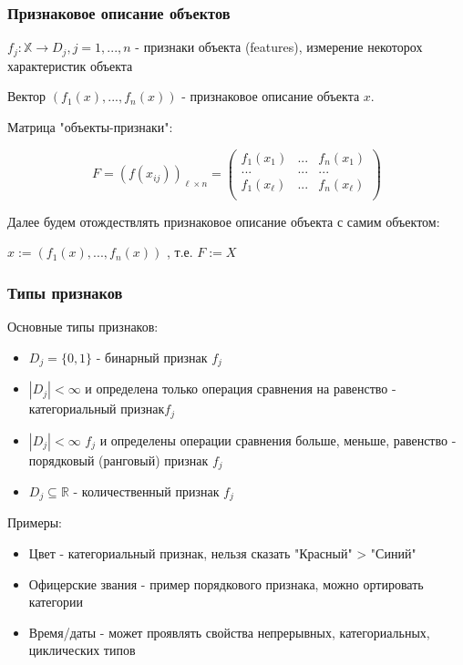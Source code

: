 \documentclass{beamer}
\begin{document}
	\begin{frame}
		\frametitle{Признаковое описание объектов}
		
		$f_j: \mathbb{X} \to D_j, j=1, ..., n$ - признаки объекта (features), измерение некоторох характеристик объекта
		
		
	
		Вектор $(f_1(x), ..., f_n(x))$ - признаковое описание объекта $x$.
		
		Матрица "объекты-признаки":
		
		 $$
		 F = (f(x_{ij}))_{\ell \times n} = 
		 \begin{pmatrix}
		 	f_{1}(x_1) & ... & f_{n}(x_1) \\
		 	... & ... & ... \\
		 	f_{1}(x_{\ell}) & ... & f_{n}(x_{\ell}) \\		 	
		 \end{pmatrix}
		 $$
		 
		 Далее будем отождествлять признаковое описание объекта с самим объектом:
		 
		 $x := (f_1(x), ..., f_n(x))$
		 , т.е. $F := X$
	\end{frame}
		
	
	\begin{frame}
		\frametitle{Типы признаков}
		Основные типы признаков:
		\begin{itemize}
			\item $D_j = \{0, 1\}$ - бинарный признак $f_j$
			\item $|D_j| < \infty$ и определена только операция сравнения на равенство - категориальный признак$f_j$
			\item $|D_j| < \infty$ $f_j$ и определены операции сравнения больше, меньше, равенство - порядковый (ранговый) признак $f_j$
			\item $D_j \subseteq \mathbb{R}$ - количественный признак $f_j$
		\end{itemize}
	
		\vspace{5}
		
		Примеры:
		\begin{itemize}
			\item Цвет - категориальный признак, нельзя сказать "Красный" > "Синий"
			\item Офицерские звания - пример порядкового признака, можно ортировать категории
			\item Время/даты - может проявлять свойства непрерывных, категориальных, циклических типов
		\end{itemize}
	\end{frame}
	
\end{document}
